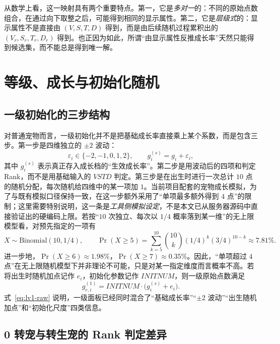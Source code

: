 从数学上看，这一映射具有两个重要特点。第一，它是\emph{多对一}的：不同的原始点数组合，在通过向下取整之后，可能得到相同的显示属性。第二，它是\emph{层级式}的：显示属性不是直接由 $(V,S,T,D)$ 得到，而是由后续随机过程累积出的 $(V_r,S_r,T_r,D_r)$ 得到。也正因为如此，所谓“由显示属性反推成长率”天然只能得到候选集，而不能总是得到唯一解。

\section{等级、成长与初始化随机}

\subsection{一级初始化的三步结构}

对普通宠物而言，一级初始化并不是把基础成长率直接乘上某个系数，而是包含三步。第一步是四维独立的 $\pm2$ 波动：
\begin{equation}
    \varepsilon_i \in \{-2,-1,0,1,2\}, \qquad g_i^{(s)} = g_i + \varepsilon_i,
\end{equation}
其中 $g_i^{(s)}$ 表示真正存入成长档的“生效成长率”。第二步是用波动后的四项和判定 Rank，而不是用基础输入的 $VSTD$ 判定。第三步是在出生时进行一次总计 $10$ 点的随机分配，每次随机给四维中的某一项加 $1$。当前项目配套的宠物成长模拟，为了与既有模拟口径保持一致，在这一步额外采用了“单项最多额外得到 $4$ 点”的限制；这里需要特别说明，这一条是\emph{工具侧模拟设定}，不是本文已从服务器源码中直接验证出的硬编码上限。若按“$10$ 次独立、每次以 $1/4$ 概率落到某一维”的无上限模型看，对预先指定的一项有
\begin{equation}
    X \sim \mathrm{Binomial}(10, 1/4), \qquad
    \Pr(X \ge 5) = \sum_{k=5}^{10} \binom{10}{k} (1/4)^k (3/4)^{10-k} \approx 7.81\%.
\end{equation}
进一步地，$\Pr(X \ge 6) \approx 1.98\%$，$\Pr(X \ge 7) \approx 0.35\%$。因此，“单项超过 $4$ 点”在无上限随机模型下并非理论不可能，只是对某一指定维度而言概率不高。若将出生时随机加点记作 $e_i$，初始化参数记作 $INITNUM$，则一级原始点数满足
\begin{equation}
    g_{r,i}^{(1)} = INITNUM \cdot \bigl(g_i^{(s)} + e_i\bigr).
    \label{eq:lv1-raw}
\end{equation}
式~\eqref{eq:lv1-raw} 说明，一级面板已经同时混合了“基础成长率”“$\pm2$ 波动”“出生随机加点”和“初始化尺度”四类信息。

\subsection{0 转宠与转生宠的 Rank 判定差异}

